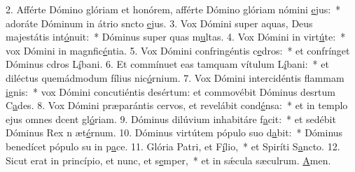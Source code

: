 2. Afférte Dómino glóriam et honórem, afférte Dómino glóriam nómini \uline{e}jus:~* adoráte Dóminum in átrio sncto \uline{e}jus.
3. Vox Dómini super aquas, Deus majestátis int\uline{ó}nuit:~* Dóminus super quas m\uline{u}ltas.
4. Vox Dómini in virt\uline{ú}te:~* vox Dómini in magnfic\uline{é}ntia.
5. Vox Dómini confringéntis c\uline{e}dros:~* et confrínget Dóminus cdros L\uline{í}bani.
6. Et commínuet eas tamquam vítulum L\uline{í}bani:~* et diléctus quemádmodum fílius nic\uline{ó}rnium.
7. Vox Dómini intercidéntis flammam \uline{i}gnis:~* vox Dómini concutiéntis desértum: et commovébit Dóminus desrtum C\uline{a}des.
8. Vox Dómini præparántis cervos, et revelábit cond\uline{é}nsa:~* et in templo ejus omnes dcent gl\uline{ó}riam.
9. Dóminus dilúvium inhabitáre f\uline{a}cit:~* et sedébit Dóminus Rex n æt\uline{é}rnum.
10. Dóminus virtútem pópulo suo d\uline{a}bit:~* Dóminus benedícet pópulo su in p\uline{a}ce.
11. Glória Patri, et F\uline{í}lio,~* et Spiríti S\uline{a}ncto.
12. Sicut erat in princípio, et nunc, et s\uline{e}mper,~* et in sǽcula sæculrum. \uline{A}men.
